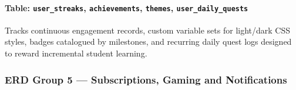 \paragraph{Table: \texttt{user\_streaks}, \texttt{achievements}, \texttt{themes}, \texttt{user\_daily\_quests}}
Tracks continuous engagement records, custom variable sets for light/dark CSS styles, badges catalogued by milestones, and recurring daily quest logs designed to reward incremental student learning.

\subsubsection{ERD Group 5 --- Subscriptions, Gaming and Notifications}

